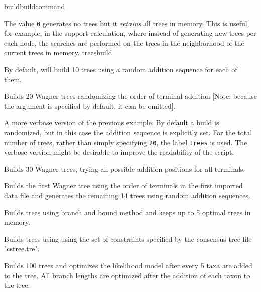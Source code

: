 \begin{command}{build}{buildcommand}
\begin{arguments}
{\setlength{\parindent}{0.5cm}                
\indent 
The value \texttt{0} generates no trees but it \emph{retains} all
trees in memory. This is useful, for example, in the 
support calculation, where instead of generating new trees per each
node, the searches are performed on the trees in the neighborhood
of the current trees in memory.} {treesbuild}


\end{arguments}

{By default, \poy will build 10 trees using a random addition
sequence for each of them.}

\begin{poyexamples}
{Builds 20 Wagner trees randomizing the order of terminal
addition [Note: because the argument  
is specified by default, it can be omitted].}

{A more verbose version of the previous example. By default a build
is randomized, but in this case the addition sequence is explicitly
set. For the total number of trees, rather than simply specifying
\texttt{20}, the label \texttt{trees} is used. The verbose version
might be desirable to improve the readability of the script.}

{Builds 30 Wagner trees, trying all possible addition positions for
all terminals}.

{Builds the first Wagner tree using the order of terminals in the first
imported data file and generates the remaining
14 trees using random addition sequences.}

{Builds trees using branch and bound method and keeps up to
5 optimal trees in memory.}

{Builds trees using using the set of constraints specified by the
consensus tree file "cstree.tre".}

{Builds 100 trees and optimizes the likelihood model after every 5
taxa are added to the tree. All branch lengths are optimized after
the addition of each taxon to the tree.}

\end{poyexamples}

\end{command}

